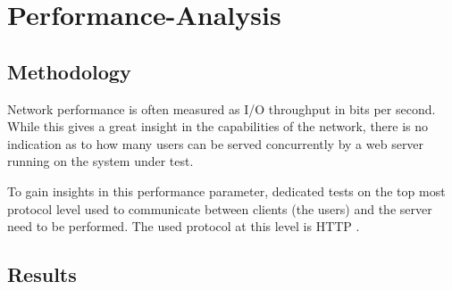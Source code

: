 \chapter{Performance-Analysis}

\section{Methodology}

Network performance is often measured as I/O throughput in bits per second. While this gives a great insight in the capabilities of the network, there is no indication as to how many users can be served concurrently by a web server running on the system under test.

To gain insights in this performance parameter, dedicated tests on the top most protocol level used to communicate between clients (the users) and the server need to be performed. The used protocol at this level is HTTP \cite{http}.

\section{Results}